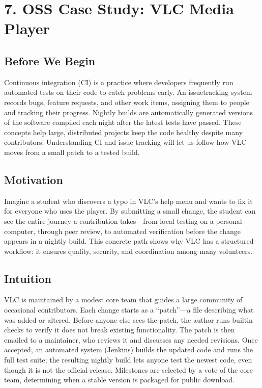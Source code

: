 \documentclass[12pt, a4paper]{article}
\begin{document}
\newpage

\section{7. OSS Case Study: VLC Media Player}

\subsection{Before We Begin}
Continuous integration (CI) is a practice where developers frequently run automated tests on their code to catch problems early. An issuetracking system records bugs, feature requests, and other work items, assigning them to people and tracking their progress. Nightly builds are automatically generated versions of the software compiled each night after the latest tests have passed. These concepts help large, distributed projects keep the code healthy despite many contributors. Understanding CI and issue tracking will let us follow how VLC moves from a small patch to a tested build.

\subsection{Motivation}
Imagine a student who discovers a typo in VLC's help menu and wants to fix it for everyone who uses the player. By submitting a small change, the student can see the entire journey a contribution takes---from local testing on a personal computer, through peer review, to automated verification before the change appears in a nightly build. This concrete path shows why VLC has a structured workflow: it ensures quality, security, and coordination among many volunteers.

\subsection{Intuition}
VLC is maintained by a modest core team that guides a large community of occasional contributors. Each change starts as a ``patch''---a file describing what was added or altered. Before anyone else sees the patch, the author runs builtin checks to verify it does not break existing functionality. The patch is then emailed to a maintainer, who reviews it and discusses any needed revisions. Once accepted, an automated system (Jenkins) builds the updated code and runs the full test suite; the resulting nightly build lets anyone test the newest code, even though it is not the official release. Milestones are selected by a vote of the core team, determining when a stable version is packaged for public download.
\end{document}
